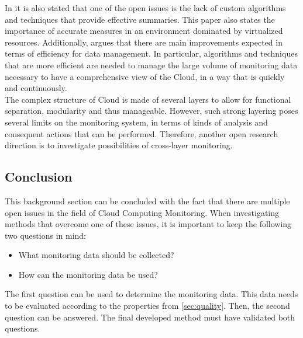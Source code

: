 \noindent
In \cite{aceto2013cloud} it is also stated that one of the open issues is the lack of custom algorithms and techniques that provide effective summaries. This paper also states the importance of accurate measures in an environment dominated by virtualized resources. Additionally, \cite{aceto2013cloud} argues that there are main improvements expected in terms of efficiency for data management. In particular, algorithms and techniques that are more efficient are needed to manage the large volume of monitoring data necessary to have a comprehensive view of the Cloud, in a way that is quickly and continuously.\\

\noindent
The complex structure of Cloud is made of several layers to allow for functional separation, modularity and thus manageable. However, such strong layering poses several limits on the monitoring system, in terms of kinds of analysis and consequent actions that can be performed. Therefore, another open research direction is to investigate possibilities of cross-layer monitoring.

\subsection{Conclusion}
This background section can be concluded with the fact that there are multiple open issues in the field of Cloud Computing Monitoring. When investigating methods that overcome one of these issues, it is important to keep the following two questions in mind:
\begin{itemize}
    \item What monitoring data should be collected?
    \item How can the monitoring data be used?
\end{itemize} 
The first question can be used to determine the monitoring data. This data needs to be evaluated according to the properties from \autoref{sec:quality}. Then, the second question can be answered. The final developed method must have validated both questions.


